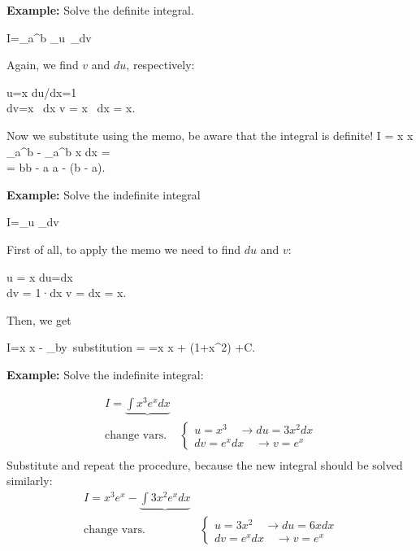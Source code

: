 {\bf Example:} Solve the definite integral.

\bnn
I=\int_a^b _{u}\, _{dv}
\enn

Again, we find $v$ and $du$, respectively:

\bnn
u=x \quad \rightarrow  du/dx=1 \\
dv=\cosh x \, dx \quad \rightarrow v = \int \cosh x \, dx = \sinh x.
\enn

Now we substitute using the memo, be aware that the integral is definite!
\bnn
I =  x \sinh x \arrowvert_a^b -  \int_a^b \sinh x dx = \\
  = b\sinh b - a \sinh a - (\cosh b - \cosh a).
\enn \svs

{\bf Example:} Solve the indefinite integral

\bnn
I=\int {}_{u} _{dv}
\enn

First of all, to apply the memo we need to find $du$ and $v$:

\bnn
u = \arccot x \quad \rightarrow du=dx\\
dv = 1·dx \quad \rightarrow v = \int dx = x.
\enn

Then, we get

\bnn
I=x \arccot x - _{\mbox{by substitution}} =
=x \arccot x + \log (1+x^2) +C.
\enn

{\bf Example:} Solve the indefinite integral:

\begin{eqnarray*}
I = \underbrace{\int x^3 e^x dx} &  \\
\mbox{change vars.}& \begin{cases} 
   u=x^3 \quad \rightarrow du=3x^2 dx\\
   dv = e^x dx  \quad \rightarrow  v= e^x 
\end{cases}  \\
\end{eqnarray*}
Substitute and repeat the procedure, because the new integral should be solved similarly:
\begin{eqnarray*}
I = x^3 e^x - \underbrace{\int 3x^2 e^x dx} &  \\
\mbox{change vars.}& \begin{cases} 
   u=3x^2 \quad \rightarrow du=6x dx\\
   dv = e^x dx  \quad \rightarrow  v= e^x 
\end{cases}  \\
\end{eqnarray*}

